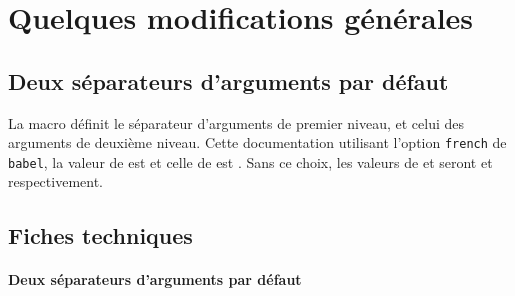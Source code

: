 \documentclass[12pt,a4paper]{article}
\begin{document}
\section{Quelques modifications générales}

\subsection{Deux séparateurs d'arguments par défaut}

La macro  définit le séparateur d'arguments de premier niveau, et  celui des arguments de deuxième niveau.
Cette documentation utilisant l'option \verb+french+ de \verb+babel+, la valeur de 
 est \fbox{\,\lymathsep$\vphantom{F}$\,} 
et celle de
 est \fbox{\,\lymathsubsep$\vphantom{F}$\,} .
Sans ce choix, les valeurs de  et  seront \fbox{\,\lymathsubsep$\vphantom{F}$\,} et \fbox{\,\lymathsep$\vphantom{F}$\,} respectivement.


\subsection{Fiches techniques}

\paragraph{Deux séparateurs d'arguments par défaut}


\end{document}
